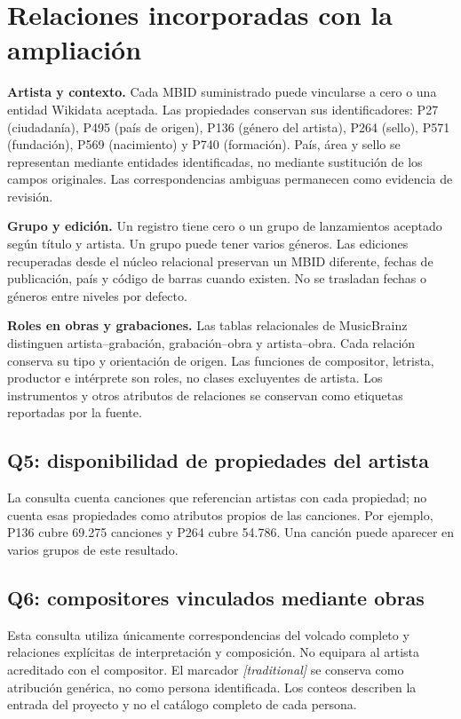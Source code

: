 \documentclass[11pt,a4paper]{article}
\begin{document}
\newpage
\section{Relaciones incorporadas con la ampliación}
\textbf{Artista y contexto.} Cada MBID suministrado puede vincularse a cero o una entidad Wikidata aceptada. Las propiedades conservan sus identificadores: P27 (ciudadanía), P495 (país de origen), P136 (género del artista), P264 (sello), P571 (fundación), P569 (nacimiento) y P740 (formación). País, área y sello se representan mediante entidades identificadas, no mediante sustitución de los campos originales. Las correspondencias ambiguas permanecen como evidencia de revisión.

\textbf{Grupo y edición.} Un registro tiene cero o un grupo de lanzamientos aceptado según título y artista. Un grupo puede tener varios géneros. Las ediciones recuperadas desde el núcleo relacional preservan un MBID diferente, fechas de publicación, país y código de barras cuando existen. No se trasladan fechas o géneros entre niveles por defecto.

\textbf{Roles en obras y grabaciones.} Las tablas relacionales de MusicBrainz distinguen artista--grabación, grabación--obra y artista--obra. Cada relación conserva su tipo y orientación de origen. Las funciones de compositor, letrista, productor e intérprete son roles, no clases excluyentes de artista. Los instrumentos y otros atributos de relaciones se conservan como etiquetas reportadas por la fuente.

\subsection{Q5: disponibilidad de propiedades del artista}

La consulta cuenta canciones que referencian artistas con cada propiedad; no cuenta esas propiedades como atributos propios de las canciones. Por ejemplo, P136 cubre 69.275 canciones y P264 cubre 54.786. Una canción puede aparecer en varios grupos de este resultado.

\subsection{Q6: compositores vinculados mediante obras}

Esta consulta utiliza únicamente correspondencias del volcado completo y relaciones explícitas de interpretación y composición. No equipara al artista acreditado con el compositor. El marcador \emph{[traditional]} se conserva como atribución genérica, no como persona identificada. Los conteos describen la entrada del proyecto y no el catálogo completo de cada persona.
\end{document}
